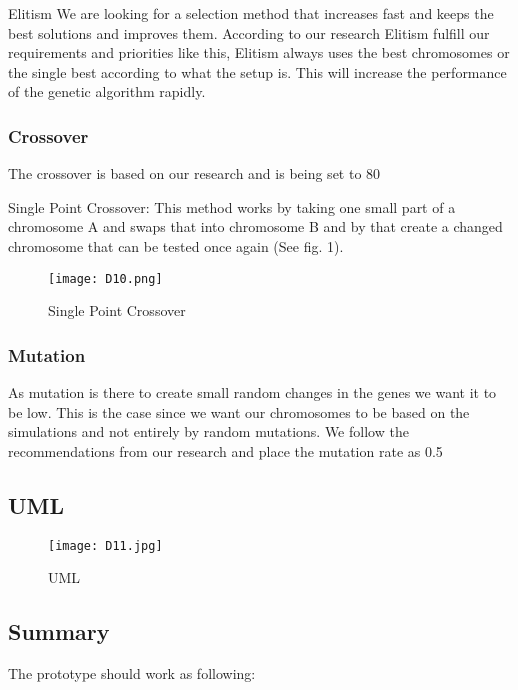 Elitism
We are looking for a selection method that increases fast and keeps the best solutions and improves them. According to our research Elitism fulfill our requirements and priorities like this, Elitism always uses the best chromosomes or the single best according to what the setup is. This will increase the performance of the genetic algorithm rapidly.

\subsubsection{Crossover}
The crossover is based on our research and is being set to 80%
 
Single Point Crossover:
This method works by taking one small part of a chromosome A and swaps that into chromosome B and by that create a changed chromosome that can be tested once again (See fig. 1). 


\begin{figure}[!htbp]
\centering
\texttt{[image: D10.png]}
\caption{ Single Point Crossover }
\label{fig:Crossover}
\end{figure}


\subsubsection{Mutation}
As mutation is there to create small random changes in the genes we want it to be low. This is the case since we want our chromosomes to be based on the simulations and not entirely by random mutations. We follow the recommendations from our research and place the mutation rate as 0.5%

\subsection{UML}

\begin{figure}[!htbp]
\centering
\texttt{[image: D11.jpg]}
\caption{ UML }
\label{fig:UML}
\end{figure}

\subsection{Summary}

The prototype should work as following:

